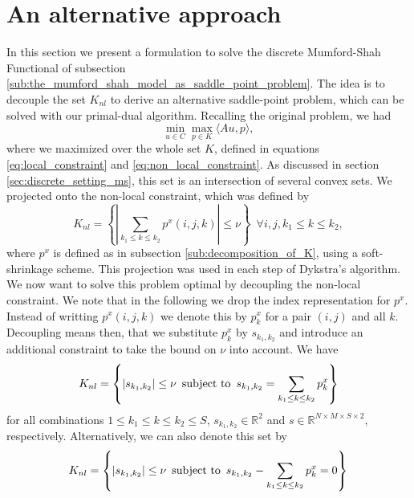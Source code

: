 \section{An alternative approach} %
\label{sec:an_alternative_approach}
    
    In this section we present a formulation to solve the discrete Mumford-Shah Functional of subsection \ref{sub:the_mumford_shah_model_as_saddle_point_problem}. The idea is to decouple the set $K_{nl}$ to derive an alternative saddle-point problem, which can be solved with our primal-dual algorithm. Recalling the original problem, we had
        \begin{equation}
            \min_{u \in C} \max_{p \in K} \langle Au, p \rangle,
            \label{eq:standard_form}
        \end{equation}
    where we maximized over the whole set $K$, defined in equations \ref{eq:local_constraint} and \ref{eq:non_local_constraint}. As discussed in section \ref{sec:discrete_setting_ms}, this set is an intersection of several convex sets. We projected onto the non-local constraint, which was defined by
        $$
            K_{nl} = \left\{ \left| \sum_{k_{1} \le k \le k_{2}} p^{x}(i, j, k) \right| \le \nu \right\} \,\,\, \forall i, j, k_{1} \le k \le k_{2},
        $$
    where $p^{x}$ is defined as in subsection \ref{sub:decomposition_of_K}, using a soft-shrinkage scheme. This projection was used in each step of Dykstra's algorithm. We now want to solve this problem optimal by decoupling the non-local constraint. We note that in the following we drop the index representation for $p^{x}$. Instead of writting $p^{x}(i, j, k)$ we denote this by $p^{x}_{k}$ for a pair $(i,j)$ and all $k$. Decoupling means then, that we substitute $p^{x}_{k}$ by $s_{k_{1}, k_{2}}$ and introduce an additional constraint to take the bound on $\nu$ into account. We have
        \begin{equation}
            K_{nl} = \left\{ |s_{k_{1}, k_{2}}| \le \nu \,\,\, \textnormal{subject to} \,\,\, s_{k_{1}, k_{2}} = \sum_{k_{1} \le k \le k_{2}} p^{x}_{k} \right\}
            \label{eq:non_local_constraint_reloaded}
        \end{equation}
    for all combinations $1 \le k_{1} \le k \le k_{2} \le S$, $s_{k_{1}, k_{2}} \in \mathbb{R}^{2}$ and $s \in \mathbb{R}^{N \times M \times S \times 2}$, respectively. Alternatively, we can also denote this set by
        $$
            K_{nl} = \left\{ |s_{k_{1}, k_{2}}| \le \nu \,\,\, \textnormal{subject to} \,\,\, s_{k_{1}, k_{2}} - \sum_{k_{1} \le k \le k_{2}} p^{x}_{k} = 0 \right\}
        $$
